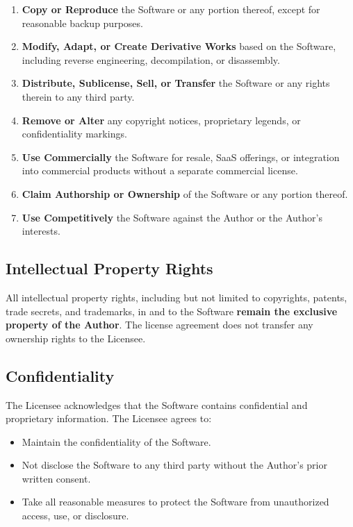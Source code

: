 \documentclass[12pt,a4paper]{report}
\begin{document}
\begin{enumerate}[leftmargin=*]
    \item \textbf{Copy or Reproduce} the Software or any portion thereof, except for reasonable backup purposes.
    \item \textbf{Modify, Adapt, or Create Derivative Works} based on the Software, including reverse engineering, decompilation, or disassembly.
    \item \textbf{Distribute, Sublicense, Sell, or Transfer} the Software or any rights therein to any third party.
    \item \textbf{Remove or Alter} any copyright notices, proprietary legends, or confidentiality markings.
    \item \textbf{Use Commercially} the Software for resale, SaaS offerings, or integration into commercial products without a separate commercial license.
    \item \textbf{Claim Authorship or Ownership} of the Software or any portion thereof.
    \item \textbf{Use Competitively} the Software against the Author or the Author's interests.
\end{enumerate}

\subsection{Intellectual Property Rights}
All intellectual property rights, including but not limited to copyrights, patents, trade secrets, and trademarks, in and to the Software \textbf{remain the exclusive property of the Author}. The license agreement does not transfer any ownership rights to the Licensee.

\subsection{Confidentiality}
The Licensee acknowledges that the Software contains confidential and proprietary information. The Licensee agrees to:
\begin{itemize}[leftmargin=*]
    \item Maintain the confidentiality of the Software.
    \item Not disclose the Software to any third party without the Author's prior written consent.
    \item Take all reasonable measures to protect the Software from unauthorized access, use, or disclosure.
\end{itemize}
\end{document}
